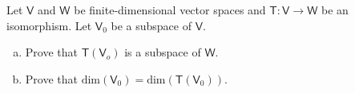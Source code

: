 Let $\mathsf{V}$ and $\mathsf{W}$ be finite-dimensional vector spaces
and $\mathsf{T}\colon \mathsf{V} \to \mathsf{W}$ be an
isomorphism. Let $\mathsf{V}_0$ be a subspace of $\mathsf{V}$.
\begin{enumerate}[(a)]
\item Prove that $\mathsf{T}(\mathsf{V}_o)$ is a subspace of
  $\mathsf{W}$.
\item Prove that $\text{dim}(\mathsf{V}_0) = \text{dim}(\mathsf{T}(\mathsf{V}_0))$.
\end{enumerate}
